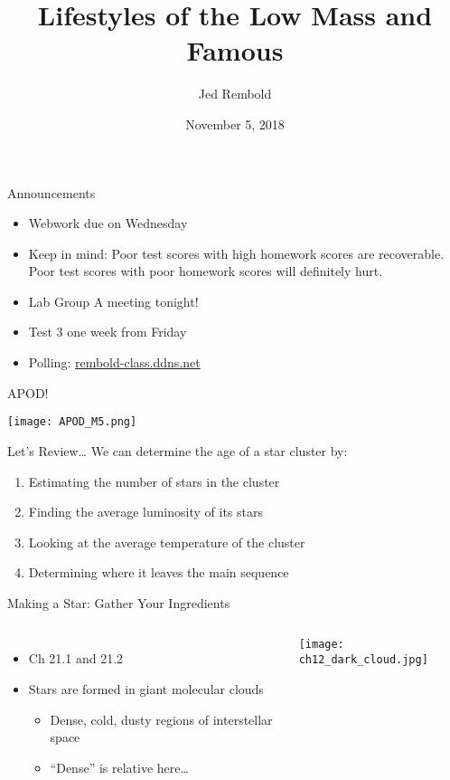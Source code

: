 \documentclass[pdf,aspectratio=169]{beamer}
\title{Lifestyles of the Low Mass and Famous}
\date{November 5, 2018}
\author{Jed Rembold}
\begin{document}
\renewcommand*{\theenumi}{\Alph{enumi}}

\begin{frame}{Announcements}
  \begin{itemize}
	  \item Webwork due on Wednesday
	  \item Keep in mind: Poor test scores with high homework scores are recoverable. Poor test scores with poor homework scores will definitely hurt.
	  \item Lab Group A meeting tonight!
	  \item Test 3 one week from Friday
	  \item Polling: \url{rembold-class.ddns.net}
  \end{itemize}
\end{frame}

\begin{frame}{APOD!}
	\begin{center}
		\texttt{[image: APOD\_M5.png]}
	\end{center}
\end{frame}

\begin{frame}{Let's Review\ldots}
  We can determine the age of a star cluster by:
  \begin{enumerate}
	\item Estimating the number of stars in the cluster
	\item Finding the average luminosity of its stars
	\item Looking at the average temperature of the cluster
	\item \alert<2>{Determining where it leaves the main sequence}
  \end{enumerate}
\end{frame}

\begin{frame}{Making a Star: Gather Your Ingredients}
	\begin{columns}
		  \begin{itemize}
			  \item Ch 21.1 and 21.2
			\item Stars are formed in giant molecular clouds
			  \begin{itemize}
				\item Dense, cold, dusty regions of interstellar space
				\item ``Dense'' is relative here\ldots
			  \end{itemize}
		  \end{itemize}
		
		  \begin{center}
			\texttt{[image: ch12\_dark\_cloud.jpg]}
		  \end{center}
		
	\end{columns}
\end{frame}
\end{document}
